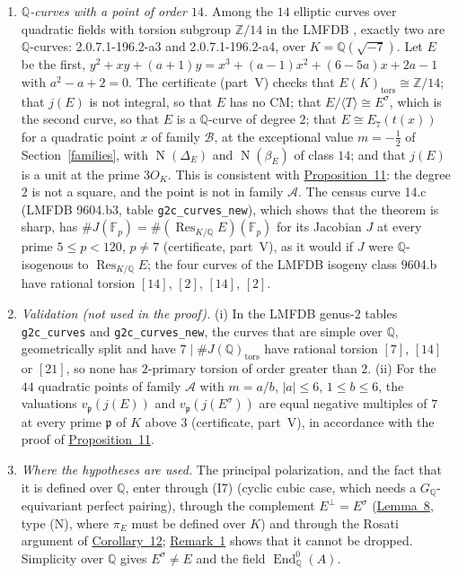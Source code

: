 \documentclass[11pt]{article}
\newcommand{\Q}{\mathbb Q}
\newcommand{\Z}{\mathbb Z}
\newcommand{\F}{\mathbb F}
\DeclareMathOperator{\End}{End}
\DeclareMathOperator{\Res}{Res}
\DeclareMathOperator{\Norm}{N}
\begin{document}
\begin{enumerate}
\item \emph{\(\Q\)-curves with a point of order \(14\).} Among the \(14\) elliptic curves over quadratic fields with
torsion subgroup \(\Z/14\) in the LMFDB \cite{LMFDB}, exactly two are \(\Q\)-curves: 2.0.7.1-196.2-a3 and
2.0.7.1-196.2-a4, over \(K=\Q(\sqrt{-7})\). Let \(E\) be the first,
\(y^2+xy+(a+1)y=x^3+(a-1)x^2+(6-5a)x+2a-1\) with \(a^2-a+2=0\). The certificate (part~V) checks that
\(E(K)_{\mathrm{tors}}\cong\Z/14\); that \(j(E)\) is not integral, so that \(E\) has no CM; that
\(E/\langle T\rangle\cong E^\sigma\), which is the second curve, so that \(E\) is a \(\Q\)-curve of degree \(2\);
that \(E\cong E_7(t(x))\) for a quadratic point \(x\) of family \(\mathcal B\), at the exceptional value
\(m=-\frac12\) of Section~\ref{families}, with \(\Norm(\Delta_E)\) and \(\Norm(\beta_E)\) of class \(14\); and that
\(j(E)\) is a unit at the prime \(3O_K\). This is consistent with \hyperref[prop-square]{Proposition~11}: the degree \(2\) is
not a square, and the point is not in family \(\mathcal A\). The census curve 14.c (LMFDB 9604.b3, table
\texttt{g2c\_curves\_new}), which shows that the theorem is sharp, has \(\#J(\F_p)=\#(\Res_{K/\Q}E)(\F_p)\) for its
Jacobian \(J\) at every prime \(5\le p<120\), \(p\ne7\) (certificate, part~V), as it would if \(J\) were
\(\Q\)-isogenous to \(\Res_{K/\Q}E\); the four curves of the LMFDB isogeny class 9604.b have rational torsion
\([14]\), \([2]\), \([14]\), \([2]\).

\item \emph{Validation (not used in the proof).} (i) In the LMFDB genus-\(2\) tables \texttt{g2c\_curves} and
\texttt{g2c\_curves\_new}, the curves that are simple over \(\Q\), geometrically split and have
\(7\mid\#J(\Q)_{\mathrm{tors}}\) have rational torsion \([7]\), \([14]\) or \([21]\), so none has \(2\)-primary
torsion of order greater than \(2\). (ii) For the \(44\) quadratic points of family \(\mathcal A\) with \(m=a/b\),
\(|a|\le6\), \(1\le b\le6\), the valuations \(v_{\mathfrak p}(j(E))\) and \(v_{\mathfrak p}(j(E^\sigma))\) are equal
negative multiples of \(7\) at every prime \(\mathfrak p\) of \(K\) above \(3\) (certificate, part~V), in accordance
with the proof of \hyperref[prop-square]{Proposition~11}.

\item \emph{Where the hypotheses are used.} The principal polarization, and the fact that it is defined over \(\Q\), enter
through (I7) (cyclic cubic case, which needs a \(G_{\Q}\)-equivariant perfect pairing), through the complement
\(E^\perp=E^\sigma\) (\hyperref[lemma-glue]{Lemma~8}, type (N), where \(\pi_E\) must be defined over \(K\)) and through
the Rosati argument of \hyperref[cor-imag]{Corollary~12}; \hyperref[rem-pp]{Remark~1} shows that it
cannot be dropped. Simplicity over \(\Q\) gives \(E^\sigma\ne E\) and the field \(\End^0_{\Q}(A)\).
\end{enumerate}
\end{document}
